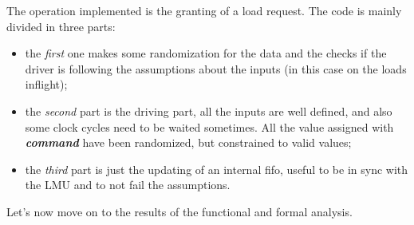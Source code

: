 The operation implemented is the granting of a load request. The code is mainly divided in three parts: 
\begin{itemize}
    \item the \emph{first} one makes some randomization for the data and the checks if the driver is following the assumptions about the inputs (in this case on the loads inflight);
    
    \item the \emph{second} part is the driving part, all the inputs are well defined, and also some clock cycles need to be waited sometimes. All the value assigned with \textbf{\emph{command}} have been randomized, but constrained to valid values;
    
    \item the \emph{third} part is just the updating of an internal fifo, useful to be in sync with the LMU and to not fail the assumptions.
\end{itemize}  
\bigskip








Let's now move on to the results of the functional and formal analysis.
